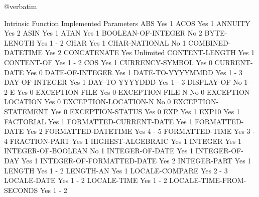 @verbatim

Intrinsic Function              Implemented     Parameters
ABS                             Yes             1
ACOS                            Yes             1
ANNUITY                         Yes             2
ASIN                            Yes             1
ATAN                            Yes             1
BOOLEAN-OF-INTEGER              No              2
BYTE-LENGTH                     Yes             1 - 2
CHAR                            Yes             1
CHAR-NATIONAL                   No              1
COMBINED-DATETIME               Yes             2
CONCATENATE                     Yes             Unlimited
CONTENT-LENGTH                  Yes             1
CONTENT-OF                      Yes             1 - 2
COS                             Yes             1
CURRENCY-SYMBOL                 Yes             0
CURRENT-DATE                    Yes             0
DATE-OF-INTEGER                 Yes             1
DATE-TO-YYYYMMDD                Yes             1 - 3
DAY-OF-INTEGER                  Yes             1
DAY-TO-YYYYDDD                  Yes             1 - 3
DISPLAY-OF                      No              1 - 2
E                               Yes             0
EXCEPTION-FILE                  Yes             0
EXCEPTION-FILE-N                No              0
EXCEPTION-LOCATION              Yes             0
EXCEPTION-LOCATION-N            No              0
EXCEPTION-STATEMENT             Yes             0
EXCEPTION-STATUS                Yes             0
EXP                             Yes             1
EXP10                           Yes             1
FACTORIAL                       Yes             1
FORMATTED-CURRENT-DATE          Yes             1
FORMATTED-DATE                  Yes             2
FORMATTED-DATETIME              Yes             4 - 5
FORMATTED-TIME                  Yes             3 - 4
FRACTION-PART                   Yes             1
HIGHEST-ALGEBRAIC               Yes             1
INTEGER                         Yes             1
INTEGER-OF-BOOLEAN              No              1
INTEGER-OF-DATE                 Yes             1
INTEGER-OF-DAY                  Yes             1
INTEGER-OF-FORMATTED-DATE       Yes             2
INTEGER-PART                    Yes             1
LENGTH                          Yes             1 - 2
LENGTH-AN                       Yes             1
LOCALE-COMPARE                  Yes             2 - 3
LOCALE-DATE                     Yes             1 - 2
LOCALE-TIME                     Yes             1 - 2
LOCALE-TIME-FROM-SECONDS        Yes             1 - 2
